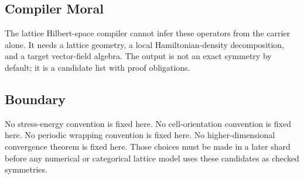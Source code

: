 \subsection{Compiler Moral}

The lattice Hilbert-space compiler cannot infer these operators from the carrier
alone.  It needs a lattice geometry, a local Hamiltonian-density decomposition,
and a target vector-field algebra.  The output is not an exact symmetry by
default; it is a candidate list with proof obligations.

\subsection{Boundary}

No stress-energy convention is fixed here.  No cell-orientation convention is
fixed here.  No periodic wrapping convention is fixed here.  No
higher-dimensional convergence theorem is fixed here.  Those choices must be
made in a later shard before any numerical or categorical lattice model uses
these candidates as checked symmetries.
